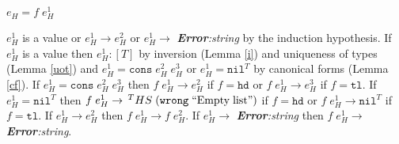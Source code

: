 \begin{case}
$e_{H}=f\;e_{H}^{1}$

$e_{H}^{1}$ is a value or $e_{H}^{1}\rightarrow e_{H}^{2}$ or $e_{H}^{1}\rightarrow$ \emph{\textbf{Error}:\;string} by the induction hypothesis.  If $e_{H}^{1}$ is a value then $e_{H}^{1}:[T]$ by inversion (Lemma \ref{i}) and uniqueness of types (Lemma \ref{uot}) and $e_{H}^{1}=\mathtt{cons}\;e_{H}^{2}\;e_{H}^{3}$ or $e_{H}^{1}=\mathtt{nil}^{T}$ by canonical forms (Lemma \ref{cf}).  If $e_{H}^{1}=\mathtt{cons}\;e_{H}^{2}\;e_{H}^{3}$ then $f\;e_{H}^{1}\rightarrow e_{H}^{2}$ if $f=\mathtt{hd}$ or $f\;e_{H}^{1}\rightarrow e_{H}^{3}$ if $f=\mathtt{tl}$.  If $e_{H}^{1}=\mathtt{nil}^{T}$ then $f\;e_{H}^{1}\rightarrow\,^{T}HS\;(\mathtt{wrong}\;\mathrm{``Empty\;list"})$ if $f=\mathtt{hd}$ or $f\;e_{H}^{1}\rightarrow\mathtt{nil}^{T}$ if $f=\mathtt{tl}$.  If $e_{H}^{1}\rightarrow e_{H}^{2}$ then $f\;e_{H}^{1}\rightarrow f\;e_{H}^{2}$.  If $e_{H}^{1}\rightarrow$ \emph{\textbf{Error}:\;string} then $f\;e_{H}^{1}\rightarrow$ \emph{\textbf{Error}:\;string}.
\end{case}
